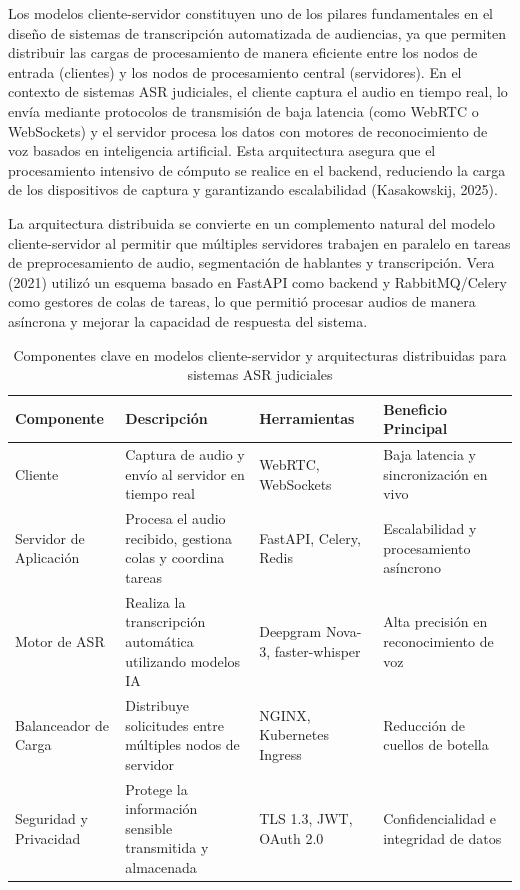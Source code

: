 \documentclass[12pt,a4paper,oneside]{report}
\begin{document}
Los modelos cliente-servidor constituyen uno de los pilares fundamentales en el diseño de sistemas de transcripción automatizada de audiencias, ya que permiten distribuir las cargas de procesamiento de manera eficiente entre los nodos de entrada (clientes) y los nodos de procesamiento central (servidores). En el contexto de sistemas ASR judiciales, el cliente captura el audio en tiempo real, lo envía mediante protocolos de transmisión de baja latencia (como WebRTC o WebSockets) y el servidor procesa los datos con motores de reconocimiento de voz basados en inteligencia artificial. Esta arquitectura asegura que el procesamiento intensivo de cómputo se realice en el backend, reduciendo la carga de los dispositivos de captura y garantizando escalabilidad (Kasakowskij, 2025).

La arquitectura distribuida se convierte en un complemento natural del modelo cliente-servidor al permitir que múltiples servidores trabajen en paralelo en tareas de preprocesamiento de audio, segmentación de hablantes y transcripción. Vera (2021) utilizó un esquema basado en FastAPI como backend y RabbitMQ/Celery como gestores de colas de tareas, lo que permitió procesar audios de manera asíncrona y mejorar la capacidad de respuesta del sistema.

\begin{table}[H]
\centering
\caption{Componentes clave en modelos cliente-servidor y arquitecturas distribuidas para sistemas ASR judiciales}
\begin{tabular}{|p{2.5cm}|p{3.5cm}|p{3cm}|p{3cm}|}
\hline
\rowcolor{gray!20}
\textbf{Componente} & \textbf{Descripción} & \textbf{Herramientas} & \textbf{Beneficio Principal} \\
\hline
Cliente & Captura de audio y envío al servidor en tiempo real & WebRTC, WebSockets & Baja latencia y sincronización en vivo \\
\hline
Servidor de Aplicación & Procesa el audio recibido, gestiona colas y coordina tareas & FastAPI, Celery, Redis & Escalabilidad y procesamiento asíncrono \\
\hline
Motor de ASR & Realiza la transcripción automática utilizando modelos IA & Deepgram Nova-3, faster-whisper & Alta precisión en reconocimiento de voz \\
\hline
Balanceador de Carga & Distribuye solicitudes entre múltiples nodos de servidor & NGINX, Kubernetes Ingress & Reducción de cuellos de botella \\
\hline
Seguridad y Privacidad & Protege la información sensible transmitida y almacenada & TLS 1.3, JWT, OAuth 2.0 & Confidencialidad e integridad de datos \\
\hline
\end{tabular}
\label{tab:cliente_servidor}
\end{table}
\end{document}
